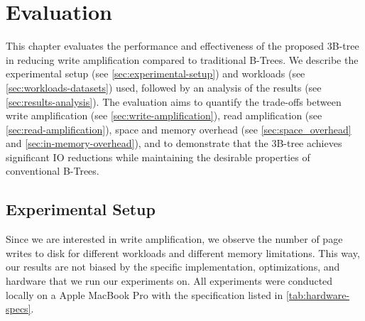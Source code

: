 \chapter{Evaluation}
\label{chap:evaluation}



This chapter evaluates the performance and effectiveness of the proposed 3B-tree in reducing write amplification compared to traditional B-Trees. 
We describe the experimental setup (see \autoref{sec:experimental-setup}) and workloads (see \autoref{sec:workloads-datasets}) used, followed by an analysis of the results (see \autoref{sec:results-analysis}). 
The evaluation aims to quantify the trade-offs between write amplification (see \autoref{sec:write-amplification}), read amplification (see \autoref{sec:read-amplification}), space and memory overhead (see \autoref{sec:space_overhead} and \autoref{sec:in-memory-overhead}), and to demonstrate that the 3B-tree achieves significant \ac{IO} reductions while maintaining the desirable properties of conventional B-Trees.

\section{Experimental Setup}
\label{sec:experimental-setup}
Since we are interested in write amplification, we observe the number of page writes to disk for different workloads and different memory limitations.
This way, our results are not biased by the specific implementation, optimizations, and hardware that we run our experiments on.
All experiments were conducted locally on a Apple MacBook Pro with the specification listed in \autoref{tab:hardware-specs}.

